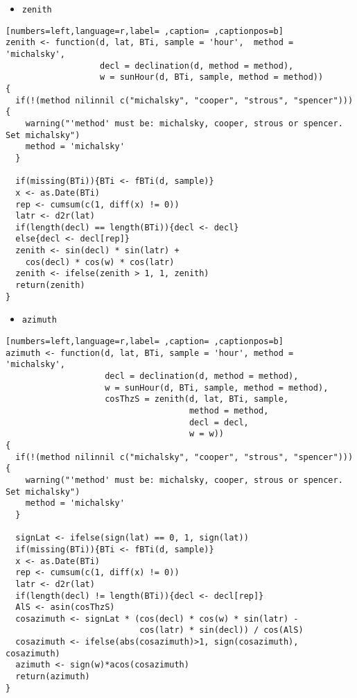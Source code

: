 \begin{itemize}
\item \texttt{zenith}
\end{itemize}
\begin{lstlisting}[numbers=left,language=r,label= ,caption= ,captionpos=b]
zenith <- function(d, lat, BTi, sample = 'hour',  method = 'michalsky',
                   decl = declination(d, method = method),
                   w = sunHour(d, BTi, sample, method = method))
{
  if(!(method nilinnil c("michalsky", "cooper", "strous", "spencer"))){
    warning("'method' must be: michalsky, cooper, strous or spencer.
Set michalsky")
    method = 'michalsky'
  }

  if(missing(BTi)){BTi <- fBTi(d, sample)}
  x <- as.Date(BTi)
  rep <- cumsum(c(1, diff(x) != 0))
  latr <- d2r(lat)
  if(length(decl) == length(BTi)){decl <- decl}
  else{decl <- decl[rep]}
  zenith <- sin(decl) * sin(latr) +
    cos(decl) * cos(w) * cos(latr)
  zenith <- ifelse(zenith > 1, 1, zenith)
  return(zenith)
}
\end{lstlisting}
\begin{itemize}
\item \texttt{azimuth}
\end{itemize}
\begin{lstlisting}[numbers=left,language=r,label= ,caption= ,captionpos=b]
azimuth <- function(d, lat, BTi, sample = 'hour', method = 'michalsky',
                    decl = declination(d, method = method),
                    w = sunHour(d, BTi, sample, method = method),
                    cosThzS = zenith(d, lat, BTi, sample,
                                     method = method,
                                     decl = decl,
                                     w = w))
{
  if(!(method nilinnil c("michalsky", "cooper", "strous", "spencer"))){
    warning("'method' must be: michalsky, cooper, strous or spencer.
Set michalsky")
    method = 'michalsky'
  }

  signLat <- ifelse(sign(lat) == 0, 1, sign(lat)) 
  if(missing(BTi)){BTi <- fBTi(d, sample)}
  x <- as.Date(BTi)
  rep <- cumsum(c(1, diff(x) != 0))
  latr <- d2r(lat)
  if(length(decl) != length(BTi)){decl <- decl[rep]}
  AlS <- asin(cosThzS)
  cosazimuth <- signLat * (cos(decl) * cos(w) * sin(latr) -
                           cos(latr) * sin(decl)) / cos(AlS)
  cosazimuth <- ifelse(abs(cosazimuth)>1, sign(cosazimuth), cosazimuth)
  azimuth <- sign(w)*acos(cosazimuth)
  return(azimuth)
}
\end{lstlisting}
